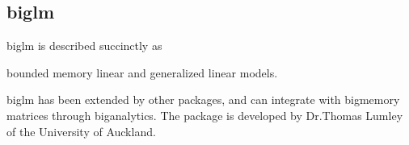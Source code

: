 \hypertarget{sec:biglm}{%
    \subsection{biglm}\label{sec:biglm}}

biglm is described succinctly as

\begin{displayquote}
    bounded memory linear and generalized linear
    models\cite{lumley2013biglm}.
\end{displayquote}

biglm has been extended by other packages, and can integrate with
bigmemory matrices through biganalytics. The package is developed by
Dr.Thomas Lumley of the University of Auckland.